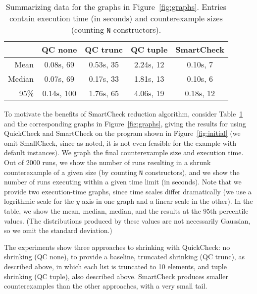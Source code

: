 \documentclass{sigplanconf}
\newcommand{\ttp}[1]{\texttt{#1}}
\begin{document}
\begin{table}[ht]
\footnotesize
  \begin{center}
    \begin{tabular}{|r||c|c|c|c|}
\hline
           & QC none    & QC trunc   & QC tuple   & SmartCheck\\
\hline \hline
Mean       & 0.08s, 69  & 0.53s, 35  & 2.24s, 12  & 0.10s, 7\\
\hline
Median     & 0.07s, 69  & 0.17s, 33  & 1.81s, 13  & 0.10s, 6\\
\hline
95\%       & 0.14s, 100 & 1.76s, 65  & 4.06s, 19  & 0.18s, 12\\
\hline
    \end{tabular}
  \end{center}
  \caption{Summarizing data for the graphs in Figure~\ref{fig:graphs}. Entries
    contain execution time (in seconds) and counterexample sizes (counting
    \ttp{N} constructors).}
  \label{table:results}
\end{table}

To motivate the benefits of SmartCheck reduction algorithm, consider
Table~\ref{table:results} and the corresponding graphs in
Figure~\ref{fig:graphs}, giving the results for using QuickCheck and SmartCheck
on the program shown in Figure~\ref{fig:initial} (we omit SmallCheck, since as
noted, it is not even feasible for the example with default instances).  We
graph the final counterexample size and execution time.  Out of 2000 runs, we
show the number of runs resulting in a shrunk counterexample of a given size (by
counting \ttp{N} constructors), and we show the number of runs executing within
a given time limit (in seconds).  Note that we provide two execution-time
graphs, since time scales differ dramatically (we use a logrithmic scale for the
$y$ axis in one graph and a linear scale in the other).  In the table, we show
the mean, median, median, and the results at the 95th percentile values.  (The
distributions produced by these values are not necessarily Gaussian, so we omit
the standard deviation.)

The experiments show three approaches to shrinking with QuickCheck: no shrinking
(QC none), to provide a baseline, truncated shrinking (QC trunc), as described
above, in which each list is truncated to 10 elements, and tuple shrinking (QC
tuple), also described above.  SmartCheck produces smaller counterexamples than
the other approaches, with a very small tail.
\end{document}
